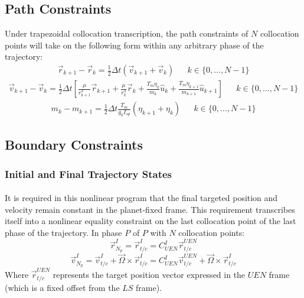 \subsection{Path Constraints}
Under trapezoidal collocation transcription, the path constraints of $N$ collocation points will take on the following form within any arbitrary phase of the trajectory:
\begin{align}
\vec{r}_{k+1} - \vec{r}_k = 
\frac{1}{2}\Delta t ( \vec{v}_{k+1} + \vec{v}_k ) &&
k \in \{ 0, ... , N-1 \}
\end{align}
\begin{align}
\vec{v}_{k+1} - \vec{v}_k = 
\frac{1}{2}\Delta t \left[ \frac{\mu }{r_{k+1}^3}\vec{r}_{k+1} + \frac{\mu }{r_{k}^3}\vec{r}_{k} +  \frac{T_m \eta_k}{m_k} \hat{u}_{k} + \frac{T_m \eta_{k+1}}{m_{k+1}} \hat{u}_{k+1} \right] &&
k \in \{ 0, ... , N-1 \}
\end{align}
\begin{align}
m_{k} - m_{k+1} = 
\frac{1}{2}\Delta t \frac{T_m}{g_0 I_{sp}} ( \eta_{k+1} + \eta_{k} ) &&
k \in \{ 0, ... , N-1 \}
\end{align}
\subsection{Boundary Constraints}
\subsubsection{Initial and Final Trajectory States}
\paragraph{}
It is required in this nonlinear program that the final targeted position and velocity remain constant in the planet-fixed frame. This requirement transcribes itself into a nonlinear equality constraint on the last collocation point of the last phase of the trajectory. In phase $P$ of $P$ with $N$ collocation points:
\begin{equation}
\vec{r}_{N_{p}}^{I} = \vec{r}_{t/c}^{I} = C_{\mathit{UEN}}^{I} \vec{r}_{t/c}^{\mathit{UEN}}
\end{equation}
\begin{equation}
\vec{v}_{N_{p}}^{I} = \vec{v}_{t/c}^{I} + \vec{\Omega} \times \vec{r}_{t/c}^{I} = C_{\mathit{UEN}}^{I} \vec{v}_{t/c}^{\mathit{UEN}} + \vec{\Omega} \times \vec{r}_{t/c}^{I}
\end{equation}
Where  $\vec{r}_{t/c}^{\mathit{UEN}}$ represents the target position vector expressed in the $\mathit{UEN}$ frame (which is a fixed offset from the $\mathit{LS}$ frame).
